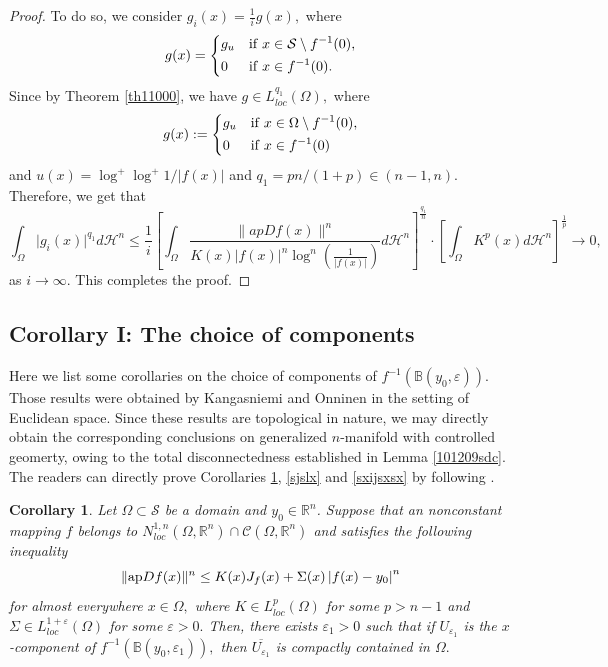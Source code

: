 \documentclass[11pt,twoside]{article}
\newtheorem{cor}[thm]{Corollary}
\theoremstyle{definition}
\theoremstyle{remark}
\newcommand{\abs}[1]{\left|#1\right|}
\begin{document}
\begin{proof}
To do so, we consider $g_{i}(x)=\frac{1}{i}g(x),$ where 
\begin{equation}\label{xgauixkx}
 g(x)=\left\{
\begin{aligned}
&g_{u}   &   &    {\rm if}\;{x\in \mathcal{S}\setminus f^{-1}(0)},\\
&0       &      &{\rm if}\; {x\in f^{-1}(0).}
\end{aligned} \right.
\end{equation}
Since by Theorem \ref{th11000}, we have $g\in L_{loc}^{q_{1}}(\Omega),$ where 
\begin{equation}\label{xgaufhgjhjkkixkx}
  g(x):=\left\{
\begin{aligned}
&g_{u}   &   &    {\rm if}\;{x\in \Omega\setminus f^{-1}(0)},\\
&0       &      &{\rm if}\; {x\in f^{-1}(0)}
\end{aligned} \right.
\end{equation}
 and $u(x)=\log^{+}\log^{+}1/\vert f(x)\vert$ and $q_{1}=pn/(1+p)\in(n-1, n).$ 
Therefore, we get that
$$\int_{\Omega}\vert g_{i}(x)\vert^{q_{1}} d\mathcal{H}^{n} \leq\frac{1}{i}\left[\int_{\Omega}\frac{\|  apDf(x)\|^{n}}{K(x)\vert f(x)\vert^{n}\log^{n}(\frac{1}{\vert f(x)\vert})}d\mathcal{H}^{n}\right]^{\frac{q_{1}}{n}}\cdot \left[\int_{\Omega}K^{p}(x)d\mathcal{H}^{n}\right]^{\frac{1}{p}}\rightarrow0,$$
 as $i\rightarrow\infty.$ This completes the proof.
\end{proof}
 
\subsection{Corollary I: The choice of components} 
Here we list some corollaries on the choice of components of $f^{-1}(\mathbb{B}(y_{0},\varepsilon)).$ Those results were obtained by Kangasniemi and  Onninen \cite{KO222} in the setting of Euclidean space. 
Since these results are topological in nature, we may directly obtain the corresponding conclusions on generalized $n$-manifold with controlled geomerty,  owing to the total disconnectedness established 
in Lemma \ref{101209sdc}. The readers can directly prove Corollaries \ref{9981}, \ref{sjslx} and \ref{sxijsxsx} by following \cite[Lemmas 4.1, 4.2 and 4.3]{KO222}. 
\begin{cor}\label{9981}
Let  $\Omega\subset\mathcal{S}$ be a domain and $y_{0}\in\mathbb{R}^{n}$. Suppose that an nonconstant mapping $f$ belongs to  $N_{loc}^{1,n}(\Omega,\mathbb{R}^{n})\cap \mathcal{C}(\Omega,\mathbb{R}^{n})$ and satisfies the following inequality
\begin{equation}
\| {\rm ap}Df(x)\|^{n}\leq K(x)J_{f}(x)+\Sigma(x)\abs{f(x)-y_{0}}^{n}
\end{equation}
for almost everywhere $x\in\Omega,$ where $K\in L_{loc}^{p}(\Omega)$ for some $p>n-1$ and $\Sigma\in L_{loc}^{1+\varepsilon}(\Omega)$ for some $\varepsilon>0.$ Then, there exists $\varepsilon_{1}>0$ such that if $U_{\varepsilon_{1}}$ is the $x$-component of $f^{-1}(\mathbb{B}(y_{0},\varepsilon_{1})),$ then $\overline{U_{\varepsilon_{1}}}$ is compactly contained in $\Omega.$
\end{cor}
\end{document}
